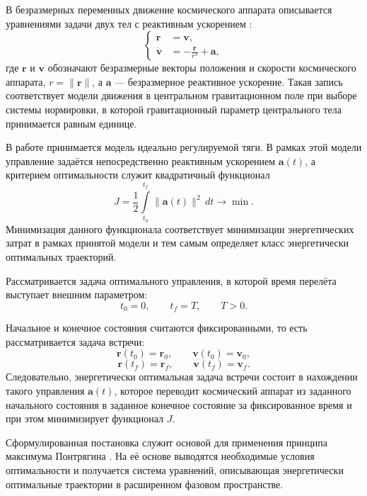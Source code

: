 В безразмерных переменных движение космического аппарата описывается уравнениями задачи двух тел с реактивным ускорением \cite{grodzovsky_small_thrust_1966}:
\begin{equation}
	\left\{
	\begin{aligned}
		\dot{\mathbf r} &= \mathbf v,\\
		\dot{\mathbf v} &= -\frac{\mathbf r}{r^{3}}+\mathbf a,
	\end{aligned}
	\right.
\end{equation}
где $\mathbf r$ и $\mathbf v$ обозначают безразмерные векторы положения и скорости космического аппарата, $r=\|\mathbf r\|$, а $\mathbf a$ --- безразмерное реактивное ускорение. Такая запись соответствует модели движения в центральном гравитационном поле при выборе системы нормировки, в которой гравитационный параметр центрального тела принимается равным единице.

В работе принимается модель идеально регулируемой тяги. В рамках этой модели управление задаётся непосредственно реактивным ускорением $\mathbf a(t)$, а критерием оптимальности служит квадратичный функционал
\begin{equation}
	J=\frac{1}{2}\int\limits_{t_0}^{t_f}\|\mathbf a(t)\|^{2}\,dt \to \min.
\end{equation}
Минимизация данного функционала соответствует минимизации энергетических затрат в рамках принятой модели и тем самым определяет класс энергетически оптимальных траекторий.

Рассматривается задача оптимального управления, в которой время перелёта выступает внешним параметром:
\begin{equation}
	t_0=0,\qquad t_f=T,\qquad T>0.
\end{equation}

Начальное и конечное состояния считаются фиксированными, то есть рассматривается задача встречи:
\begin{equation}
	\mathbf r(t_0)=\mathbf r_0,\qquad \mathbf v(t_0)=\mathbf v_0,
\end{equation}
\begin{equation}
	\mathbf r(t_f)=\mathbf r_f,\qquad \mathbf v(t_f)=\mathbf v_f.
\end{equation}
Следовательно, энергетически оптимальная задача встречи состоит в нахождении такого управления $\mathbf a(t)$, которое переводит космический аппарат из заданного начального состояния в заданное конечное состояние за фиксированное время и при этом минимизирует функционал $J$.

Сформулированная постановка служит основой для применения принципа максимума Понтрягина \cite{pontryagin_optimal_processes_ru_1976}. На её основе выводятся необходимые условия оптимальности и получается система уравнений, описывающая энергетически оптимальные траектории в расширенном фазовом пространстве.
